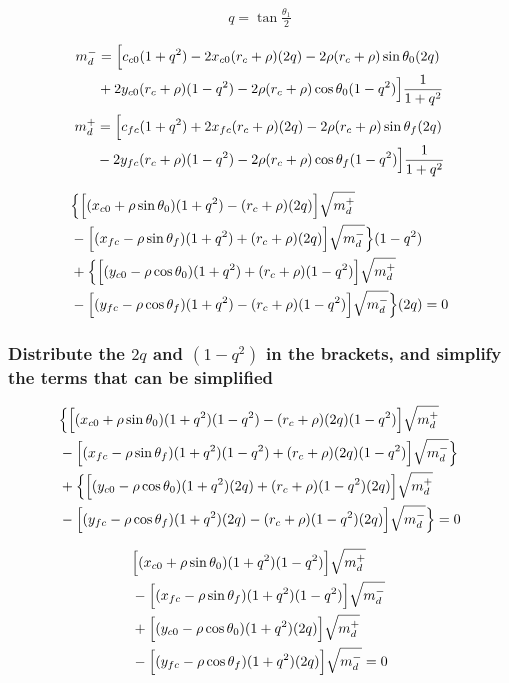 \documentclass[12pt]{article}
\begin{document}
\begin{align*}
    q = \tan\frac{\theta_1}{2}
\end{align*}

\begin{align*}
    m_d^- &= \Bigl[ c_{c0}(1 + q^2) - 2x_{c0}(r_c+\rho)(2q) - 2\rho(r_c+\rho)\sin\theta_0(2q)\\
    &+ 2y_{c0}(r_c+\rho)(1-q^2) - 2\rho(r_c+\rho)\cos\theta_0(1 - q^2) \Bigr] \frac{1}{1+q^2}
\end{align*}
\begin{align*}
    m_d^+ &= \Bigl[c_{fc}(1 + q^2) + 2x_{fc}(r_c+\rho)(2q) - 2\rho(r_c+\rho)\sin\theta_f(2q)\\
    &- 2y_{fc}(r_c+\rho)(1 - q^2) - 2\rho(r_c+\rho)\cos\theta_f(1 - q^2) \Bigr] \frac{1}{1+q^2}
\end{align*}

\begin{align*}
    &\Bigl\{\Bigl[(x_{c0} + \rho\sin\theta_0)(1 + q^2) - (r_c+\rho)(2q) \Bigr]\sqrt{m_d^+}\\
    &- \Bigl[ (x_{fc} - \rho\sin\theta_f)(1 + q^2) + (r_c+\rho)(2q)\Bigr]\sqrt{m_d^-}\Bigr\}(1-q^2) \\
    & + \Bigl\{\Bigl[ (y_{c0} - \rho\cos\theta_0)(1 + q^2) + (r_c + \rho)(1-q^2) \Bigr]\sqrt{m_d^+}\\
    &- \Bigl[ (y_{fc} - \rho\cos\theta_f)(1 + q^2) - (r_c+\rho)(1-q^2) \Bigr]\sqrt{m_d^-} \Bigr\}(2q) = 0
\end{align*}

\subsubsection*{Distribute the $2q$ and $(1-q^2)$ in the brackets, and simplify the terms that can be simplified}

\begin{align*}
    &\Bigl\{\Bigl[(x_{c0} + \rho\sin\theta_0)(1 + q^2)(1-q^2) - (r_c+\rho)(2q)(1-q^2) \Bigr]\sqrt{m_d^+}\\
    &- \Bigl[ (x_{fc} - \rho\sin\theta_f)(1 + q^2)(1-q^2) + (r_c+\rho)(2q)(1-q^2)\Bigr]\sqrt{m_d^-}\Bigr\} \\
    & + \Bigl\{\Bigl[ (y_{c0} - \rho\cos\theta_0)(1 + q^2)(2q) + (r_c + \rho)(1-q^2)(2q) \Bigr]\sqrt{m_d^+}\\
    &- \Bigl[ (y_{fc} - \rho\cos\theta_f)(1 + q^2)(2q) - (r_c+\rho)(1-q^2)(2q) \Bigr]\sqrt{m_d^-} \Bigr\} = 0
\end{align*}

\begin{align*}
    &\Bigl[(x_{c0} + \rho\sin\theta_0)(1 + q^2)(1-q^2) \Bigr]\sqrt{m_d^+}\\
    &- \Bigl[ (x_{fc} - \rho\sin\theta_f)(1 + q^2)(1-q^2) \Bigr]\sqrt{m_d^-} \\
    & + \Bigl[ (y_{c0} - \rho\cos\theta_0)(1 + q^2)(2q) \Bigr]\sqrt{m_d^+}\\
    &- \Bigl[ (y_{fc} - \rho\cos\theta_f)(1 + q^2)(2q) \Bigr]\sqrt{m_d^-}  = 0
\end{align*}
\end{document}
